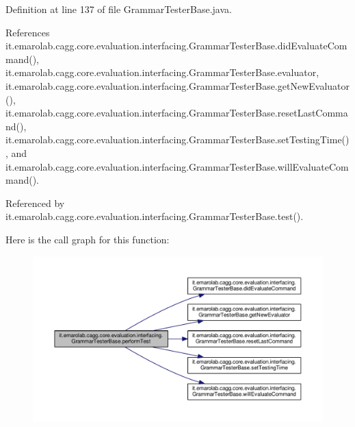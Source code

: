 Definition at line 137 of file Grammar\-Tester\-Base.\-java.



References it.\-emarolab.\-cagg.\-core.\-evaluation.\-interfacing.\-Grammar\-Tester\-Base.\-did\-Evaluate\-Command(), it.\-emarolab.\-cagg.\-core.\-evaluation.\-interfacing.\-Grammar\-Tester\-Base.\-evaluator, it.\-emarolab.\-cagg.\-core.\-evaluation.\-interfacing.\-Grammar\-Tester\-Base.\-get\-New\-Evaluator(), it.\-emarolab.\-cagg.\-core.\-evaluation.\-interfacing.\-Grammar\-Tester\-Base.\-reset\-Last\-Command(), it.\-emarolab.\-cagg.\-core.\-evaluation.\-interfacing.\-Grammar\-Tester\-Base.\-set\-Testing\-Time(), and it.\-emarolab.\-cagg.\-core.\-evaluation.\-interfacing.\-Grammar\-Tester\-Base.\-will\-Evaluate\-Command().



Referenced by it.\-emarolab.\-cagg.\-core.\-evaluation.\-interfacing.\-Grammar\-Tester\-Base.\-test().



Here is the call graph for this function\-:\nopagebreak
\begin{figure}[H]
\begin{center}
\leavevmode
\includegraphics[width=350pt]{classit_1_1emarolab_1_1cagg_1_1core_1_1evaluation_1_1interfacing_1_1GrammarTesterBase_ada7847a97c9ab96fb11f265766915e5e_cgraph}
\end{center}
\end{figure}


